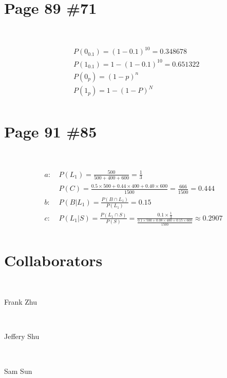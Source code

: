 \documentclass{article}
\begin{document}
\newpage

\section*{Page 89 \#71}

~

\begin{align*}
    &P(0_{0.1})=(1-0.1)^{10}=0.348678\\
    &P(1_{0.1})=1-(1-0.1)^{10}=0.651322\\
    &P(0_{p})=(1-p)^n\\
    &P(1_{p})=1-(1-P)^N\\
\end{align*}

\newpage

\section*{Page 91 \#85}

~

\begin{align*}
    a:\ &P(L_1)=\frac{500}{500+400+600}=\frac{1}{3}\\
    &P(C)=\frac{0.5\times500+0.44\times 400+0.40\times 600}{1500}=\frac{666}{1500}=0.444\\
    b:\ &P(B|L_1)=\frac{P(B\cap L_1)}{P(L_1)}=0.15\\
    c:\ &P(L_1|S)=\frac{P(L_1\cap S)}{P(S)}=\frac{0.1\times \frac{1}{3}}{\frac{0.1\times 500+0.08\times 400+0.15\times 600}{1500}}\approx0.2907\\
\end{align*}

\newpage

\section*{Collaborators}

~

Frank Zhu

~

Jeffery Shu

~

Sam Sun
\end{document}
